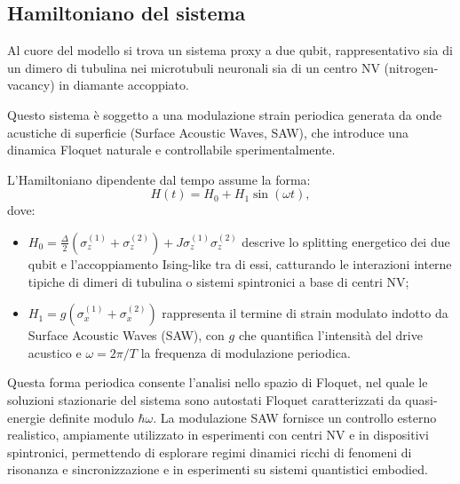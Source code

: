 \documentclass[11pt,a4paper]{article}
\theoremstyle{plain}
\theoremstyle{definition}
\begin{document}
\vspace{0.2cm}

\subsection{Hamiltoniano del sistema}
\label{subsec:hamiltonian}

\vspace{0.2cm}

Al cuore del modello si trova un sistema proxy a due qubit, rappresentativo sia di un dimero di tubulina nei microtubuli neuronali sia di un centro NV (nitrogen-vacancy) in diamante accoppiato. 


\vspace{0.2cm}


Questo sistema è soggetto a una modulazione strain periodica generata da onde acustiche di superficie (Surface Acoustic Waves, SAW), che introduce una dinamica Floquet naturale e controllabile sperimentalmente.

\clearpage

\begin{tcolorbox}[colback=blue!3!white, colframe=blue!80!black, title={\textbf{Hamiltoniano dipendente dal tempo (Floquet)}}, sharp corners, boxrule=0.8pt, coltitle=white]
L'Hamiltoniano dipendente dal tempo assume la forma:
\begin{equation}
H(t) = H_0 + H_1 \sin(\omega t),
\label{eq:hamiltonian}
\end{equation}
dove:
\begin{itemize}
    \item $H_0 = \frac{\Delta}{2} (\sigma_z^{(1)} + \sigma_z^{(2)}) + J \sigma_z^{(1)}\sigma_z^{(2)}$ descrive lo splitting energetico dei due qubit e l'accoppiamento Ising-like tra di essi, catturando le interazioni interne tipiche di dimeri di tubulina o sistemi spintronici a base di centri NV;
    \item $H_1 = g (\sigma_x^{(1)} + \sigma_x^{(2)})$ rappresenta il termine di strain modulato indotto da Surface Acoustic Waves (SAW), con $g$ che quantifica l'intensità del drive acustico e $\omega = 2\pi / T$ la frequenza di modulazione periodica.
\end{itemize}
\end{tcolorbox}


\vspace{0.2cm}


Questa forma periodica consente l'analisi nello spazio di Floquet, nel quale le soluzioni stazionarie del sistema sono autostati Floquet caratterizzati da quasi-energie definite modulo $\hbar\omega$. La modulazione SAW fornisce un controllo esterno realistico, ampiamente utilizzato in esperimenti con centri NV e in dispositivi spintronici, permettendo di esplorare regimi dinamici ricchi di fenomeni di risonanza e sincronizzazione e in esperimenti su sistemi quantistici embodied.
\end{document}

